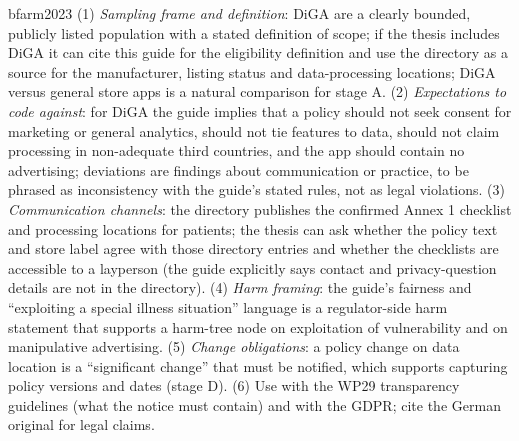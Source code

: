 \begin{papercard}{bfarm2023}
 (1) \emph{Sampling frame and definition}: DiGA are a clearly bounded, publicly listed population with a stated definition of scope; if the thesis includes DiGA it can cite this guide for the eligibility definition and use the directory as a source for the manufacturer, listing status and data-processing locations; DiGA versus general store apps is a natural comparison for stage A. (2) \emph{Expectations to code against}: for DiGA the guide implies that a policy should not seek consent for marketing or general analytics, should not tie features to data, should not claim processing in non-adequate third countries, and the app should contain no advertising; deviations are findings about communication or practice, to be phrased as inconsistency with the guide's stated rules, not as legal violations. (3) \emph{Communication channels}: the directory publishes the confirmed Annex 1 checklist and processing locations for patients; the thesis can ask whether the policy text and store label agree with those directory entries and whether the checklists are accessible to a layperson (the guide explicitly says contact and privacy-question details are not in the directory). (4) \emph{Harm framing}: the guide's fairness and ``exploiting a special illness situation'' language is a regulator-side harm statement that supports a harm-tree node on exploitation of vulnerability and on manipulative advertising. (5) \emph{Change obligations}: a policy change on data location is a ``significant change'' that must be notified, which supports capturing policy versions and dates (stage D). (6) Use with the WP29 transparency guidelines (what the notice must contain) and with the GDPR; cite the German original for legal claims.
\end{papercard}
